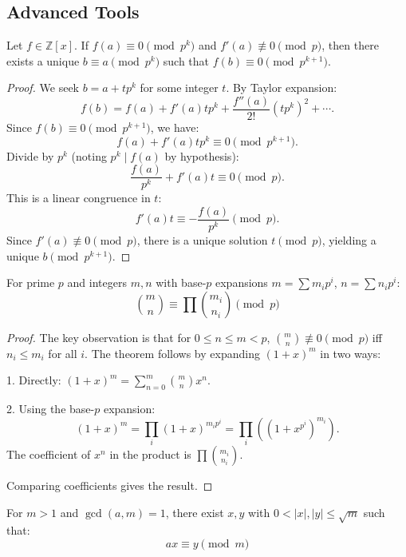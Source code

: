 \documentclass{scrartcl} %
\begin{document}
\subsection{Advanced Tools}

\begin{theorem}\label{thm:henselslemma}
Let $f \in \mathbb{Z}[x]$. If $f(a) \equiv 0 \pmod{p^k}$ and $f'(a) \not\equiv 0 \pmod{p}$, then there exists a unique $b \equiv a \pmod{p^k}$ such that $f(b) \equiv 0 \pmod{p^{k+1}}$.
\end{theorem}

\begin{proof}
We seek $b = a + t p^k$ for some integer $t$. By Taylor expansion:
\[
f(b) = f(a) + f'(a) t p^k + \frac{f''(a)}{2!} (t p^k)^2 + \cdots.
\]
Since $f(b) \equiv 0 \pmod{p^{k+1}}$, we have:
\[
f(a) + f'(a) t p^k \equiv 0 \pmod{p^{k+1}}.
\]
Divide by $p^k$ (noting $p^k \mid f(a)$ by hypothesis):
\[
\frac{f(a)}{p^k} + f'(a) t \equiv 0 \pmod{p}.
\]
This is a linear congruence in $t$:
\[
f'(a) t \equiv -\frac{f(a)}{p^k} \pmod{p}.
\]
Since $f'(a) \not\equiv 0 \pmod{p}$, there is a unique solution $t \pmod{p}$, yielding a unique $b \pmod{p^{k+1}}$.
\end{proof}

\begin{theorem}\label{thm:lucastheorem}
For prime $p$ and integers $m,n$ with base-$p$ expansions $m = \sum m_i p^i$, $n = \sum n_i p^i$:
\[ \binom{m}{n} \equiv \prod \binom{m_i}{n_i} \pmod{p} \]
\end{theorem}

\begin{proof}
The key observation is that for $0 \leq n \leq m < p$, $\binom{m}{n} \not\equiv 0 \pmod{p}$ iff $n_i \leq m_i$ for all $i$. The theorem follows by expanding $(1 + x)^m$ in two ways:

1. Directly: $(1 + x)^m = \sum_{n=0}^m \binom{m}{n} x^n$.

2. Using the base-$p$ expansion:
\[
(1 + x)^m = \prod_{i} (1 + x)^{m_i p^i} = \prod_{i} \left((1 + x^{p^i})^{m_i}\right).
\]
The coefficient of $x^n$ in the product is $\prod \binom{m_i}{n_i}$.

Comparing coefficients gives the result.
\end{proof}

\begin{lemma}\label{lem:thueslemma}
For $m > 1$ and $\gcd(a,m) = 1$, there exist $x,y$ with $0 < |x|,|y| \leq \sqrt{m}$ such that:
\[ ax \equiv y \pmod{m} \]
\end{lemma}
\end{document}

